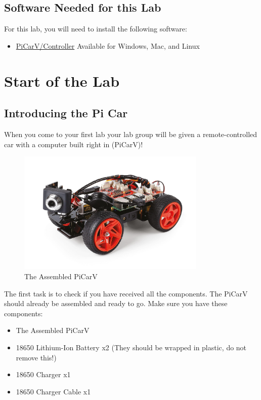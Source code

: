 \documentclass[11pt]{report}
\begin{document}
    \section{Software Needed for this Lab}
    For this lab, you will need to install the following software:
    \begin{itemize}
        \item 
        \href{https://github.com/PiCarV/Controller/releases/latest}{PiCarV/Controller} Available for Windows, Mac, and Linux     
    \end{itemize}


    \clearpage

    \chapter{Start of the Lab}

    \section{Introducing the Pi Car}
    When you come to your first lab your lab group will be given a remote-controlled car with a computer built right in (PiCarV)! 

    \begin{figure}[h]
        \centering
        \includegraphics[width=0.8\textwidth]{picarv.jpg}
        \caption{The Assembled PiCarV}
        \label{fig:The Assembled PiCarV}
    \end{figure}

    The first task is to check if you have received all the components. The PiCarV should already be assembled and ready to go. Make sure you have these components:

    \begin{itemize}
        \item The Assembled PiCarV
        \item 18650 Lithium-Ion Battery x2 (They should be wrapped in plastic, do not remove this!)
        \item 18650 Charger x1
        \item 18650 Charger Cable x1
    \end{itemize}
\end{document}
